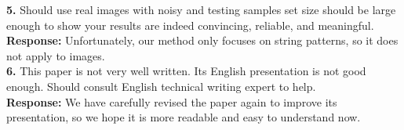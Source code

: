 \documentclass{paper}
\begin{document}
\textbf{5.} Should use real images with noisy and testing samples set
size should be large enough to show your results are indeed
convincing,
reliable, and meaningful.\\[7pt]
\noindent \textbf{Response:} Unfortunately, our method only focuses
on string patterns, so it does not apply to images.\\

\textbf{6.} This paper is not very well written. Its English
presentation is not good enough. Should consult English technical
writing expert to help.\\[7pt]
\noindent \textbf{Response:} We have carefully revised the paper again
to improve its presentation, so we hope it is more readable and easy
to understand now.
\end{document}
